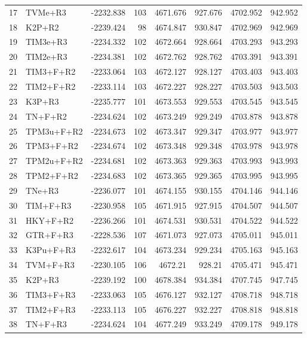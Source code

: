 \begin{longtable}{clrrrrrr}
	17 & TVMe+R3 & -2232.838 & 103 & 4671.676 & 927.676 & 4702.952 & 942.952 \\ 
	18 & K2P+R2 & -2239.424 & 98 & 4674.847 & 930.847 & 4702.969 & 942.969 \\ 
	19 & TIM3e+R3 & -2234.332 & 102 & 4672.664 & 928.664 & 4703.293 & 943.293 \\ 
	20 & TIM2e+R3 & -2234.381 & 102 & 4672.762 & 928.762 & 4703.391 & 943.391 \\ 
	21 & TIM3+F+R2 & -2233.064 & 103 & 4672.127 & 928.127 & 4703.403 & 943.403 \\ 
	22 & TIM2+F+R2 & -2233.114 & 103 & 4672.227 & 928.227 & 4703.503 & 943.503 \\ 
	23 & K3P+R3 & -2235.777 & 101 & 4673.553 & 929.553 & 4703.545 & 943.545 \\ 
	24 & TN+F+R2 & -2234.624 & 102 & 4673.249 & 929.249 & 4703.878 & 943.878 \\ 
	25 & TPM3u+F+R2 & -2234.673 & 102 & 4673.347 & 929.347 & 4703.977 & 943.977 \\ 
	26 & TPM3+F+R2 & -2234.674 & 102 & 4673.348 & 929.348 & 4703.978 & 943.978 \\ 
	27 & TPM2u+F+R2 & -2234.681 & 102 & 4673.363 & 929.363 & 4703.993 & 943.993 \\ 
	28 & TPM2+F+R2 & -2234.683 & 102 & 4673.365 & 929.365 & 4703.995 & 943.995 \\ 
	29 & TNe+R3 & -2236.077 & 101 & 4674.155 & 930.155 & 4704.146 & 944.146 \\ 
	30 & TIM+F+R3 & -2230.958 & 105 & 4671.915 & 927.915 & 4704.507 & 944.507 \\ 
	31 & HKY+F+R2 & -2236.266 & 101 & 4674.531 & 930.531 & 4704.522 & 944.522 \\ 
	32 & GTR+F+R3 & -2228.536 & 107 & 4671.073 & 927.073 & 4705.011 & 945.011 \\ 
	33 & K3Pu+F+R3 & -2232.617 & 104 & 4673.234 & 929.234 & 4705.163 & 945.163 \\ 
	34 & TVM+F+R3 & -2230.105 & 106 & 4672.21 & 928.21 & 4705.471 & 945.471 \\ 
	35 & K2P+R3 & -2239.192 & 100 & 4678.384 & 934.384 & 4707.745 & 947.745 \\ 
	36 & TIM3+F+R3 & -2233.063 & 105 & 4676.127 & 932.127 & 4708.718 & 948.718 \\ 
	37 & TIM2+F+R3 & -2233.113 & 105 & 4676.227 & 932.227 & 4708.818 & 948.818 \\ 
	38 & TN+F+R3 & -2234.624 & 104 & 4677.249 & 933.249 & 4709.178 & 949.178 \\ 

\end{longtable}
